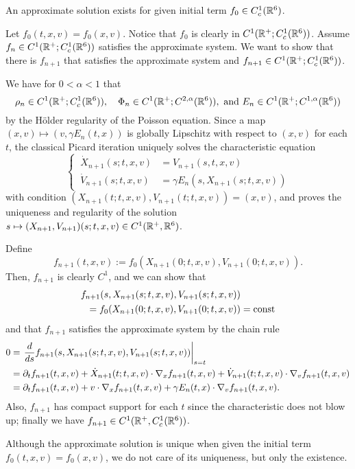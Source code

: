 \documentclass{article}
\begin{document}
\begin{prop}
An approximate solution exists for given initial term $f_0\in C_c^1(\mathbb{R}^6)$.
\end{prop}
\begin{pf}
Let $f_0(t,x,v)=f_0(x,v)$.
Notice that $f_0$ is clearly in $C^1(\mathbb{R}^+;C_c^1(\mathbb{R}^6))$.
Assume $f_n\in C^1(\mathbb{R}^+;C_c^1(\mathbb{R}^6))$ satisfies the approximate system.
We want to show that there is $f_{n+1}$ that satisfies the approximate system and $f_{n+1}\in C^1(\mathbb{R}^+;C_c^1(\mathbb{R}^6))$.

We have for $0<\alpha<1$ that
\[\rho_n\in C^1(\R^+;C_c^1(\R^6)),\quad\Phi_n\in C^1(\R^+;C^{2,\alpha}(\R^6)),\ \text{and}\ E_n\in C^1(\R^+;C^{1,\alpha}(\R^6))\]
by the H\"older regularity of the Poisson equation.
Since a map $(x,v)\mapsto(v,\gamma E_n(t,x))$ is globally Lipschitz with respect to $(x,v)$ for each $t$, the classical Picard iteration uniquely solves the characteristic equation
\[\left\{\ \begin{alignedat}{2}
\dot X_{n+1}(s;t,x,v)&=V_{n+1}(s,t,x,v)\\
\dot V_{n+1}(s;t,x,v)&=\gamma E_n(s,X_{n+1}(s;t,x,v))
\end{alignedat}\right.\]
with condition $(X_{n+1}(t;t,x,v),V_{n+1}(t;t,x,v))=(x,v)$, and proves the uniqueness and regularity of the solution $s\mapsto(X_{n+1},V_{n+1})(s;t,x,v)\in C^1(\mathbb{R}^+,\mathbb{R}^6)$.

Define
\[f_{n+1}(t,x,v):=f_0(X_{n+1}(0;t,x,v),V_{n+1}(0;t,x,v)).\]
Then, $f_{n+1}$ is clearly $C^1$, and we can show that
\begin{align*}
f_{n+1}(s,X_{n+1}(s;t,x,v),V_{n+1}(s;t,x,v))&\\
=f_0(X_{n+1}(0;t,x,v),V_{n+1}(0;t,x,v))&=\operatorname{const}
\end{align*}
and that $f_{n+1}$ satisfies the approximate system by the chain rule
\begin{align*}
0&=\left.\dd{s}f_{n+1}(s,X_{n+1}(s;t,x,v),V_{n+1}(s;t,x,v))\right|_{s=t}\\
&=\pd_tf_{n+1}(t,x,v)+\dot X_{n+1}(t;t,x,v)\cdot\nabla_xf_{n+1}(t,x,v)+\dot V_{n+1}(t;t,x,v)\cdot\nabla_vf_{n+1}(t,x,v)\\
&=\pd_tf_{n+1}(t,x,v)+v\cdot\nabla_xf_{n+1}(t,x,v)+\gamma E_n(t,x)\cdot\nabla_vf_{n+1}(t,x,v).
\end{align*}
Also, $f_{n+1}$ has compact support for each $t$ since the characteristic does not blow up; finally we have $f_{n+1}\in C^1(\mathbb{R}^+,C_c^1(\mathbb{R}^6))$.
\end{pf}
\begin{rmk}
Although the approximate solution is unique when given the initial term $f_0(t,x,v)=f_0(x,v)$, we do not care of its uniqueness, but only the existence.
\end{rmk}
\end{document}
